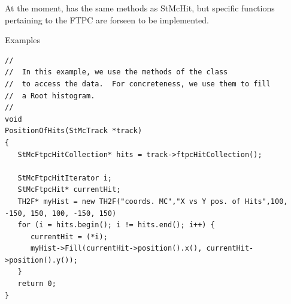 \begin{Entry}
    At the moment, has the same methods as StMcHit, but specific
    functions pertaining to the FTPC are forseen to be implemented.

\item[Examples]
{\footnotesize
\begin{verbatim}
//
//  In this example, we use the methods of the class
//  to access the data.  For concreteness, we use them to fill
//  a Root histogram. 
//  
void
PositionOfHits(StMcTrack *track)
{
   StMcFtpcHitCollection* hits = track->ftpcHitCollection();

   StMcFtpcHitIterator i;
   StMcFtpcHit* currentHit;
   TH2F* myHist = new TH2F("coords. MC","X vs Y pos. of Hits",100, -150, 150, 100, -150, 150)
   for (i = hits.begin(); i != hits.end(); i++) {
      currentHit = (*i);
      myHist->Fill(currentHit->position().x(), currentHit->position().y());
   }
   return 0;
}
\end{verbatim}
}%
\end{Entry}


%
%
